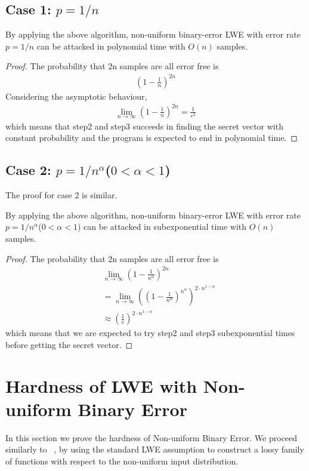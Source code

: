 \documentclass[a4paper]{article}
\theoremstyle{definition}
\theoremstyle{remark}
\begin{document}
\subsection{Case 1: $p = 1/n$}
\begin{theorem}
  By applying the above algorithm, non-uniform binary-error LWE with error rate $p = 1 / n$
  can be attacked in polynomial time with $O(n)$ samples.
\end{theorem}
\begin{proof}
  The probability that 2n samples are all error free is
  \begin{gather*}
    (1 - \frac{1}{n})^{2n}
  \end{gather*}
  Considering the asymptotic behaviour,
  \begin{gather*}
    \lim_{n\to\infty} (1 - \frac{1}{n})^{2n} = \frac{1}{e^{2}}
  \end{gather*}
  which means that step2 and step3 succeeds in finding the secret vector with 
  constant probability and the program is expected to end in polynomial time.
\end{proof}
\subsection{Case 2: $p = 1/n^{\alpha}$($0 < \alpha < 1$)}
The proof for case 2 is similar.
\begin{theorem}
  By applying the above algorithm, non-uniform binary-error LWE with error rate $p = 1 / n^{\alpha}$($0 < \alpha < 1$)
  can be attacked in subexponential time with $O(n)$ samples.
\end{theorem}
\begin{proof}
  The probability that 2n samples are all error free is
  \begin{align*}
    &\lim_{n\to\infty}  (1 - \frac{1}{n^{\alpha}})^{2n}\\
    & = \lim_{n\to\infty}  ((1 - \frac{1}{n^{\alpha}})^{n^{\alpha}})^{2\cdot n^{1 - \alpha}}\\
    & \approx (\frac{1}{e})^{2\cdot n^{1 - \alpha}}
  \end{align*}
which means that we are expected to try step2 and step3 subexponential times before 
getting the secret vector.
\end{proof}
\section{Hardness of LWE with Non-uniform Binary Error}
In this section we prove the hardness of Non-uniform Binary Error. 
We proceed similarly to ~\cite{micciancio2013hardness}, by using the standard LWE assumption to 
construct a lossy family of functions with respect to the non-uniform input distribution. 
\end{document}
